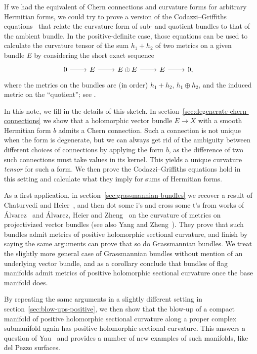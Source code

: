 \documentclass[10pt,a4paper]{amsart}
\theoremstyle{definition}
\begin{document}
If we had the equivalent of Chern connections and curvature forms for arbitrary Hermitian forms, we could try to prove a version of the Codazzi--Griffiths equations~\cite{griffiths1965hermitian} that relate the curvature form of sub- and quotient bundles to that of the ambient bundle. In the positive-definite case, those equations can be used to calculate the curvature tensor of the sum $h_1 + h_2$ of two metrics on a given bundle $E$ by considering the short exact sequence
\[
\begin{tikzcd}
0 \ar[r] & E \ar[r] & E\oplus E \ar[r] &  E \ar[r] & 0,
\end{tikzcd}
\]
where the metrics on the bundles are (in order) $h_1 + h_2$, $h_1 \oplus h_2$, and the induced metric on the ``quotient''; see \cite[Chapter~7, Exercise~6]{zheng2000complex}.

In this note, we fill in the details of this sketch. In section~\ref{sec:degenerate-chern-connections} we show that a holomorphic vector bundle $E \to X$ with a smooth Hermitian form $b$ admits a Chern connection. Such a connection is not unique when the form is degenerate, but we can always get rid of the ambiguity between different choices of connections by applying the form $b$, as the difference of two such connections must take values in its kernel. This yields a unique curvature \emph{tensor} for such a form. We then prove the Codazzi--Griffiths equations hold in this setting and calculate what they imply for sums of Hermitian forms.

As a first application, in section~\ref{sec:grassmannian-bundles} we
recover a result of Chaturvedi and Heier~\cite{chaturvedi2020hermitian}, and
then dot some i's and cross some t's from works of
\'Alvarez~\cite{alvarez2016positive} and \'Alvarez, Heier and
Zheng~\cite{alvarez2018projectivized} on the curvature of metrics on
projectivized vector bundles (see also Yang and
Zheng~\cite{yang2019hirzebruch}). They prove that such bundles admit metrics of
positive holomorphic sectional curvature, and finish by saying the same
arguments can prove that so do Grassmannian bundles. We treat the slightly more
general case of Grassmannian bundles without mention of an underlying vector
bundle, and as a corollary conclude that bundles of flag manifolds admit
metrics of positive holomorphic sectional curvature once the base manifold
does.

By repeating the same arguments in a slightly different setting in
section~\ref{sec:blow-ups-positive}, we then show that the blow-up of a compact
manifold of positive holomorphic sectional curvature along a proper complex
submanifold again has positive holomorphic sectional curvature.
This answers a question of Yau~\cite[Problem~67]{yau1993open} and provides a
number of new examples of such manifolds, like del Pezzo surfaces.
\end{document}
